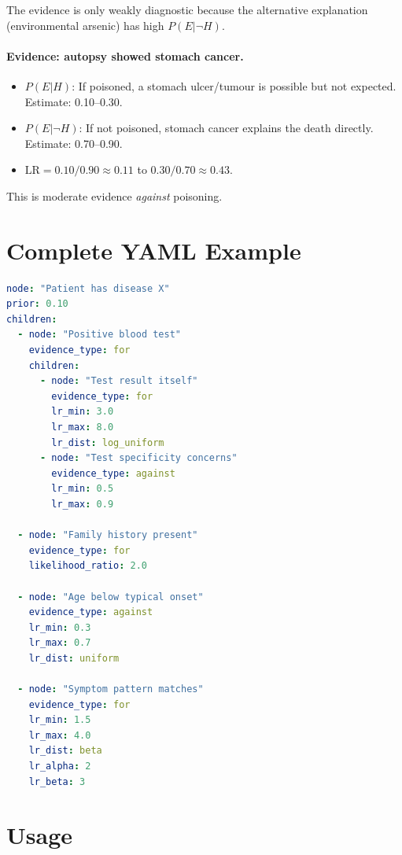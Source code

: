 \documentclass[11pt,a4paper]{article}
\begin{document}
The evidence is only weakly diagnostic because the alternative explanation
(environmental arsenic) has high $P(E|\neg H)$.

\paragraph{Evidence: autopsy showed stomach cancer.}
\begin{itemize}
\item $P(E|H)$: If poisoned, a stomach ulcer/tumour is possible but not
  expected. Estimate: 0.10--0.30.
\item $P(E|\neg H)$: If not poisoned, stomach cancer explains the death
  directly. Estimate: 0.70--0.90.
\item $\text{LR} = 0.10/0.90 \approx 0.11$ to $0.30/0.70 \approx 0.43$.
\end{itemize}

This is moderate evidence \emph{against} poisoning.

\section{Complete YAML Example}

\begin{lstlisting}[language=yaml]
node: "Patient has disease X"
prior: 0.10
children:
  - node: "Positive blood test"
    evidence_type: for
    children:
      - node: "Test result itself"
        evidence_type: for
        lr_min: 3.0
        lr_max: 8.0
        lr_dist: log_uniform
      - node: "Test specificity concerns"
        evidence_type: against
        lr_min: 0.5
        lr_max: 0.9

  - node: "Family history present"
    evidence_type: for
    likelihood_ratio: 2.0

  - node: "Age below typical onset"
    evidence_type: against
    lr_min: 0.3
    lr_max: 0.7
    lr_dist: uniform

  - node: "Symptom pattern matches"
    evidence_type: for
    lr_min: 1.5
    lr_max: 4.0
    lr_dist: beta
    lr_alpha: 2
    lr_beta: 3
\end{lstlisting}

\section{Usage}
\end{document}
